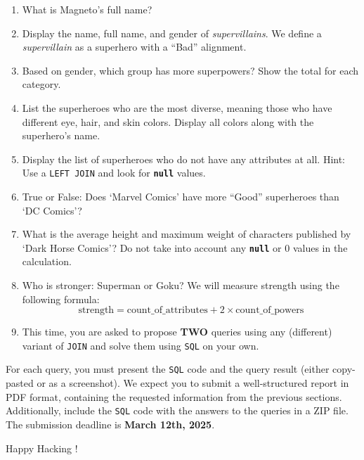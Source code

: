 \documentclass{article}
\begin{document}
\begin{enumerate}
  \item What is Magneto's full name?
  \item Display the name, full name, and gender of \textit{supervillains}. We define a \textit{supervillain} as a superhero with a ``Bad'' alignment.
  \item Based on gender, which group has more superpowers? Show the total for each category.
  \item List the superheroes who are the most diverse, meaning those who have different eye, hair, and skin colors. Display all colors along with the superhero's name.
  \item Display the list of superheroes who do not have any attributes at all. Hint: Use a \texttt{LEFT JOIN} and look for \texttt{\textbf{null}} values.
  \item True or False: Does `Marvel Comics' have more ``Good'' superheroes than `DC Comics'?
  \item What is the average height and maximum weight of characters published by `Dark Horse Comics'? Do not take into account any \texttt{\textbf{null}} or $0$ values in the calculation.
  \item Who is stronger: Superman or Goku? We will measure strength using the following formula:
  $$
    \text{strength} = \text{count\_of\_attributes} + 2 \times \text{count\_of\_powers}
  $$
  \item This time, you are asked to propose \textbf{TWO} queries using any (different) variant of \texttt{JOIN} and solve them using \texttt{SQL} on your own.
\end{enumerate}

For each query, you must present the \texttt{SQL} code and the query result (either copy-pasted or as a screenshot). We expect you to submit a well-structured report in PDF format, containing the requested information from the previous sections. Additionally, include the \texttt{SQL} code with the answers to the queries in a ZIP file. The submission deadline is \textbf{March 12th, 2025}.

\vspace{4mm}
Happy Hacking \smiley{}!
\end{document}
